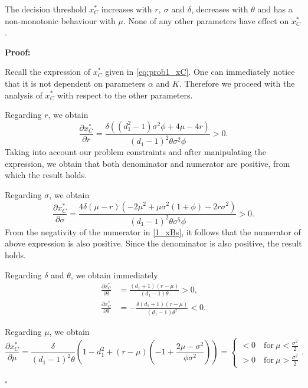 \begin{prop}
	\label{1_prop2}
The decision threshold $x^*_C$ increases with $r, \ \sigma$ and $\delta$, decreases with $\theta$ and has a non-monotonic behaviour with  $\mu$. None of any other parameters have effect on $x^*_C$.
\end{prop}

\textbf{Proof:}

Recall the expression of $x^*_C$ given in \eqref{eq:prob1_xC}. One can immediately notice that it is not dependent on parameters $\alpha$ and $K$. Therefore we proceed with the analysis of $x^*_C$ with respect to the other parameters.

Regarding $r$, we obtain
$$\frac{\partial x^*_C}{\partial r}=\frac{\delta  \left(\left(d_1^2-1\right) \sigma ^2  \phi+4 \mu -4 r\right)}{(d_1-1)^2 \theta  \sigma ^2 \phi}>0.$$
Taking into account our problem constraints and after manipulating the expression, we obtain that both denominator and numerator are positive, from which the result holds.


Regarding $\sigma$, we obtain
$$\frac{\partial x^*_C}{\partial \sigma}=\frac{4 \delta  (\mu -r) \left(-2 \mu ^2+\mu  \sigma ^2 (1+\phi)-2 r \sigma ^2\right)}{(d_1-1)^2 \theta  \sigma ^5 \phi}>0.$$
From the negativity of the numerator in  \eqref{1_xBs}, it follows that the numerator of above expression is also positive. Since the denominator is also positive, the result holds.

Regarding $\delta$ and  $\theta$, we obtain immediately
\begin{align*}
\frac{\partial x^*_C}{\partial \delta}&=\frac{(d_1+1) (r-\mu )}{(d_1-1) \theta }>0,\\
\frac{\partial x^*_C}{\partial \theta}&=-\frac{\delta  (d_1+1) (r-\mu )}{(d_1-1) \theta^2}<0.
\end{align*}

Regarding $\mu$, we obtain
$$\frac{\partial x^*_C}{\partial \mu}=\frac{\delta}{(d_1-1)^2 \theta} \left( 1-d_1^2 +(r-\mu)\left(-1+\frac{2\mu-\sigma^2}{\phi \sigma^2} \right) \right)= \begin{cases}
<0 \quad \text{for} \ \mu<\frac{\sigma^2}{2}\\
>0 \quad \text{for} \ \mu>\frac{\sigma^2}{2}
\end{cases}.$$
\begin{flushright}
 $\square$
\end{flushright}


